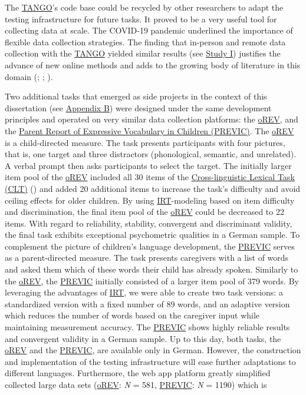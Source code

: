 \documentclass[
]{scrbook}
\begin{document}
The \hyperref[acronyms_TANGO]{TANGO}'s code base could be recycled by other researchers to adapt the testing infrastructure for future tasks. It proved to be a very useful tool for collecting data at scale. The COVID-19 pandemic underlined the importance of flexible data collection strategies. The finding that in-person and remote data collection with the \hyperref[acronyms_TANGO]{TANGO} yielded similar results (see \hyperref[studyI]{Study I}) justifies the advance of new online methods and adds to the growing body of literature in this domain (; ; ).

Two additional tasks that emerged as side projects in the context of this dissertation (see \hyperref[appendixB]{Appendix B}) were designed under the same development principles and operated on very similar data collection platforms: the \hyperref[acronyms_oREV]{oREV}, and the \hyperref[acronyms_PREVIC]{Parent Report of Expressive Vocabulary in Children (PREVIC)}. The \hyperref[acronyms_oREV]{oREV} is a child-directed measure. The task presents participants with four pictures, that is, one target and three distractors (phonological, semantic, and unrelated). A verbal prompt then asks participants to select the target. The initially larger item pool of the \hyperref[acronyms_oREV]{oREV} included all 30 items of the \hyperref[acronyms_CLT]{Cross-linguistic Lexical Task (CLT)} () and added 20 additional items to increase the task's difficulty and avoid ceiling effects for older children. By using \hyperref[acronyms_IRT]{IRT}-modeling based on item difficulty and discrimination, the final item pool of the \hyperref[acronyms_oREV]{oREV} could be decreased to 22 items. With regard to reliability, stability, convergent and discriminant validity, the final task exhibits exceptional psychometric qualities in a German sample. To complement the picture of children's language development, the \hyperref[acronyms_PREVIC]{PREVIC} serves as a parent-directed measure. The task presents caregivers with a list of words and asked them which of these words their child has already spoken. Similarly to the \hyperref[acronyms_oREV]{oREV}, the \hyperref[acronyms_PREVIC]{PREVIC} initially consisted of a larger item pool of 379 words. By leveraging the advantages of \hyperref[acronyms_IRT]{IRT}, we were able to create two task versions: a standardized version with a fixed number of 89 words, and an adaptive version which reduces the number of words based on the caregiver input while maintaining measurement accuracy. The \hyperref[acronyms_PREVIC]{PREVIC} shows highly reliable results and convergent validity in a German sample. Up to this day, both tasks, the \hyperref[acronyms_oREV]{oREV} and the \hyperref[acronyms_PREVIC]{PREVIC}, are available only in German. However, the construction and implementation of the testing infrastructure will ease further adaptations to different languages. Furthermore, the web app platform greatly simplified collected large data sets (\hyperref[acronyms_oREV]{oREV}: \emph{N} = 581, \hyperref[acronyms_PREVIC]{PREVIC}: \emph{N} = 1190) which is 
\end{document}

